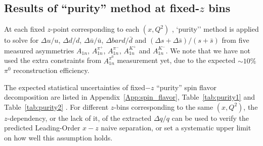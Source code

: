 \subsection{Results of ``purity'' method at fixed-$z$ bins}
At each fixed $z$-point corresponding to each $(x,Q^2)$ ,  `purity'' method is applied to solve for $\Delta u/u$, $\Delta d/d$, $\Delta \bar{u}/\bar{u}$,  $\Delta bar{d}/\bar{d}$ and $(\Delta s+\Delta \bar{s})/(s+\bar{s})$ from five measured asymmetries $A_{1n}$, $A_{1n}^{\pi^+}$, $A_{1n}^{\pi^-}$, $A_{1n}^{K^+}$ and  $A_{1n}^{K^-}$.  We note that we have not used  the extra constraints from $A_{1n}^{\pi^0}$ measurement yet, due to the expected  $\sim 10 \%$  $\pi^0$ reconstruction efficiency.

The expected statistical uncertainties of fixed$-z$ ``purity'' spin flavor decomposition are listed in Appendix~\ref{App:spin_flavor}, Table~\ref{tab:purity1}  and Table~\ref{tab:purity2} . For different $z$-bins corresponding to the same $(x,Q^2)$, the $z$-dependency, or the lack of it, of the extracted $\Delta q/q$ can be used to verify the predicted Leading-Order $x-z$ naive separation, or set a systematic upper limit on how well this assumption holds. 


